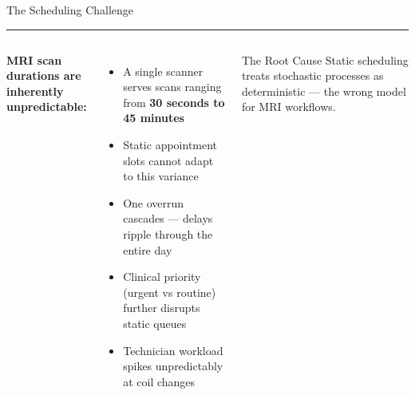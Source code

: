 \documentclass[aspectratio=169,12pt]{beamer}
\newcommand{\tealsep}{\vspace{1pt}\textcolor{SiemensTeal}{\rule{\linewidth}{1pt}}\vspace{4pt}}
\begin{document}
\begin{frame}[shrink=20]{The Scheduling Challenge}
\tealsep
\begin{columns}[T]
\textbf{MRI scan durations are inherently unpredictable:}
\vspace{6pt}
\begin{itemize}\setlength\itemsep{6pt}
  \item A single scanner serves scans ranging from \alert{\textbf{30 seconds to 45 minutes}}
  \item Static appointment slots cannot adapt to this variance
  \item One overrun cascades — delays ripple through the entire day
  \item Clinical priority (urgent vs routine) further disrupts static queues
  \item Technician workload spikes unpredictably at coil changes
\end{itemize}
\vspace{8pt}
\begin{alertblock}{The Root Cause}
  Static scheduling treats stochastic processes as deterministic — the wrong model for MRI workflows.
\end{alertblock}

\end{columns}
\end{frame}
\end{document}
